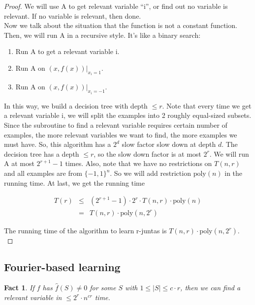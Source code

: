\documentclass[12pt]{article}
\newtheorem{fact}[theorem]{Fact}
\newcommand{\poly}{\mathrm{poly}}
\begin{document}
\begin{proof}
We will use A to get relevant variable ``i'', or find out no variable
is relevant. If no variable is relevant, then done. \\

Now we talk about the situation that the function is not a constant
function. Then, we will run A in a recursive style. It's like a binary
search:

\begin{enumerate}
\item Run A to get a relevant variable i.
\item Run A on $(x, f(x)) |_{x_i = 1}$.
\item Run A on $(x, f(x)) |_{x_i = -1}$.
\end{enumerate}

In this way, we build a decision tree with depth $\le r$. Note that
every time we get a relevant variable i, we will split the examples
into 2 roughly equal-sized subsets. Since the subroutine to find a
relevant variable requires certain number of examples, the more
relevant variables we want to find, the more examples we must
have. So, this algorithm has a $2^d$ slow factor slow down at depth
$d$. The decision tree has a depth $\le r$, so the slow down factor is
at most $2^r$. We will run A at most $2^{r+1} - 1$ times. Also, note
that we have no restrictions on $T(n, r)$ and all examples are from
$\{ -1, 1\}^n$. So we will add restriction $\poly {(n)}$ in the
running time. At last, we get the running time

\begin{eqnarray*}
T(r)
&\le& (2^{r+1} - 1) \cdot 2^r \cdot T(n, r) \cdot \poly {(n)} \\
&=& T(n, r) \cdot \poly {(n, 2^r)}
\end{eqnarray*}

The running time of the algorithm to learn r-juntas is $T(n,r) \cdot
\poly (n, 2^r)$. \\
\end{proof}

\subsection{Fourier-based learning}

\begin{fact}
If $f$ has $\hat {f}(S) \neq 0$ for some $S$ with $1 \le |S| \le c
\cdot r$, then we can find a relevant variable in $\le 2^r \cdot
n^{cr}$ time.
\end{fact}
\end{document}
